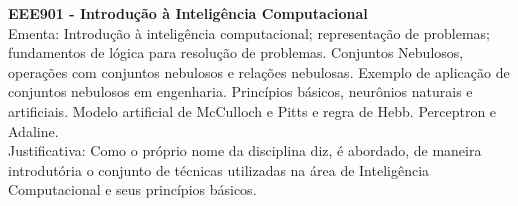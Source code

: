 \documentclass{article}
\begin{document}
	\textbf{EEE901 - Introdução à Inteligência Computacional} \\
	Ementa: Introdução à inteligência computacional; representação de problemas; fundamentos de lógica para resolução de problemas. Conjuntos Nebulosos, operações com conjuntos nebulosos e relações nebulosas. Exemplo de aplicação de conjuntos nebulosos em engenharia. Princípios básicos, neurônios naturais e artificiais. Modelo artificial de McCulloch e Pitts e regra de Hebb. Perceptron e Adaline. \\
	Justificativa: Como o próprio nome da disciplina diz, é abordado, de maneira introdutória o conjunto de técnicas utilizadas na área de Inteligência Computacional e seus princípios básicos. \\
\end{document}
